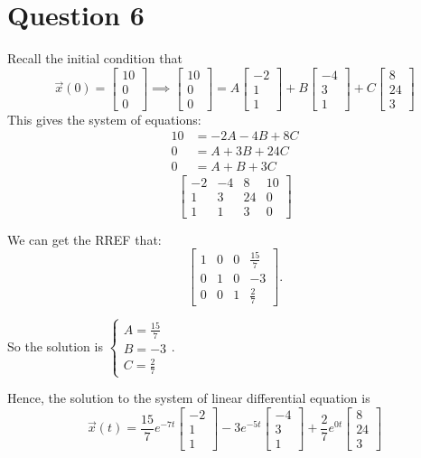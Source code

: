 \documentclass[12pt,a4paper]{article}
\begin{document}
\section*{Question 6}
\begin{solution}
Recall the initial condition that
\[
\vec{x}(0) = \begin{bmatrix}
    10\\0\\0
\end{bmatrix} 
\implies
\left[\begin{array}{c}
10 \\
0 \\
0
\end{array}\right]=A\left[\begin{array}{c}
-2 \\
1 \\
1
\end{array}\right]+B\left[\begin{array}{c}
-4 \\
3 \\
1
\end{array}\right]+C\left[\begin{array}{c}
8 \\
24 \\
3
\end{array}\right]
\]
This gives the system of equations:
\begin{align*}
10 &= -2A - 4B + 8C \\
0 &= A + 3B + 24C\\
0 &= A + B + 3C 
\end{align*}
\[
\begin{bmatrix}
-2 & -4 & 8 & 10 \\
1 & 3 & 24 & 0 \\
1 & 1 & 3 & 0
\end{bmatrix}
\]

We can get the RREF that:
\[
\begin{bmatrix}
1 & 0 & 0 & \frac{15}{7} \\
0 & 1 & 0 & -3 \\
0 & 0 & 1 & \frac{2}{7}
\end{bmatrix}.
\]

So the solution is 
$
\begin{cases}
    A = \frac{15}{7}\\
    B = -3\\
    C = \frac{2}{7}
\end{cases}.
$

Hence, the solution to the system of linear differential equation is
\[
\vec{x}(t)=
\frac{15}{7} e^{-7t} \begin{bmatrix}-2\\1\\1\end{bmatrix}
-3 e^{-5t}\begin{bmatrix}-4\\3\\1\end{bmatrix}
+\frac{2}{7} e^{0t}\begin{bmatrix}8\\ 24\\ 3\end{bmatrix}
\]
\end{solution}
\end{document}

